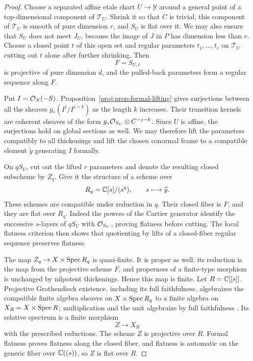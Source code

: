 \begin{proof}
Choose a separated affine etale chart $U\to\mathcal Y$
around a general point of a top-dimensional component of
$\mathcal T_U$.  Shrink it so that $C$ is trivial, this
component of $\mathcal T_U$ is smooth of pure dimension $r$,
and $S_U$ is flat over it.  We may also ensure that $S_U$
does not meet $J_U$, because the image of $J$ in $P$ has
dimension less than $r$.  Choose a closed point $t$ of this
open set and regular parameters $t_1,\ldots,t_r$ on
$\mathcal T_U$ cutting out $t$ alone after further shrinking.
Then
\[
 F=S_{U,t}
\]
is projective of pure dimension $d$, and the pulled-back
parameters form a regular sequence along $F$.

Put $I=\mathcal{O}_{\mathcal X}(-S)$.  Proposition~\ref{proj:prop:formal-lifting}
gives surjections between all the sheaves
$g_*(I^j/I^{j+k})$ as the length $k$ increases.
Their transition kernels are coherent sheaves of the form
$g_*\mathcal{O}_{S_U}\otimes C^{-j-k}$.  Since $U$ is affine, the
surjections hold on global sections as well.  We may
therefore lift the parameters compatibly to all
thickenings and lift the chosen conormal frame to a
compatible element $\widetilde y$ generating $I$ formally.

On $qS_U$, cut out the lifted $r$ parameters and denote the
resulting closed subscheme by $Z_q$.  Give it the structure
of a scheme over
\[
 R_q=\mathbb{C}[s]/(s^q),\qquad s\longmapsto\widetilde y.
\]
These schemes are compatible under reduction in $q$.
Their closed fiber is $F$, and they are flat over $R_q$.
Indeed the powers of the Cartier generator identify the
successive $s$-layers of $qS_U$ with $\mathcal{O}_{S_U}$, proving
flatness before cutting.  The local flatness criterion then
shows that quotienting by lifts of a closed-fiber regular
sequence preserves flatness.

The map
$Z_q\to X\times\operatorname{Spec} R_q$ is quasi-finite.
It is proper as well: its reduction is the map from the
projective scheme $F$, and properness of a finite-type
morphism is unchanged by nilpotent thickenings.  Hence
this map is finite.  Let $R=\mathbb{C}[[s]]$.  Projective
Grothendieck existence, including its full faithfulness,
algebraizes the compatible finite algebra sheaves on
$X\times\operatorname{Spec} R_q$ to a finite algebra on
$X_R=X\times\operatorname{Spec} R$; multiplication and the unit
algebraize by full faithfulness
\cite[Lemmas~30.24.1 and~30.24.3]{Proj-StacksExistence}.
Its relative spectrum is a finite morphism
\[
 Z\longrightarrow X_R
\]
with the prescribed reductions.  The scheme $Z$ is
projective over $R$.  Formal flatness proves flatness
along the closed fiber, and flatness is automatic on the
generic fiber over $\mathbb{C}((s))$, so $Z$ is flat over $R$.


\end{proof}
